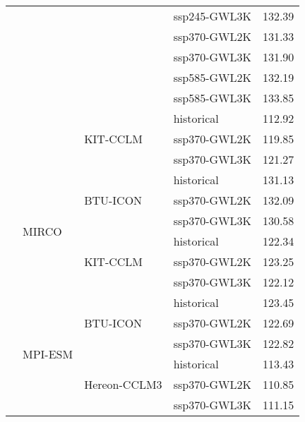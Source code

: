 \begin{table}[!htbp]
\begin{tabular}{lll|l|r}
 &  &  & ssp245-GWL3K & 132.39 \\
 &  &  & ssp370-GWL2K & 131.33 \\
 &  &  & ssp370-GWL3K & 131.90 \\
 &  &  & ssp585-GWL2K & 132.19 \\
 &  &  & ssp585-GWL3K & 133.85 \\
\cmidrule(lr){3-5}
 &  & \multirow{3}{*}{KIT-CCLM} & historical & 112.92 \\
 &  &  & ssp370-GWL2K & 119.85 \\
 &  &  & ssp370-GWL3K & 121.27 \\
\cmidrule(lr){3-5}
\cmidrule(lr){2-5}
 & \multirow{6}{*}{MIRCO} & \multirow{3}{*}{BTU-ICON} & historical & 131.13 \\
 &  &  & ssp370-GWL2K & 132.09 \\
 &  &  & ssp370-GWL3K & 130.58 \\
\cmidrule(lr){3-5}
 &  & \multirow{3}{*}{KIT-CCLM} & historical & 122.34 \\
 &  &  & ssp370-GWL2K & 123.25 \\
 &  &  & ssp370-GWL3K & 122.12 \\
\cmidrule(lr){3-5}
\cmidrule(lr){2-5}
 & \multirow{6}{*}{MPI-ESM} & \multirow{3}{*}{BTU-ICON} & historical & 123.45 \\
 &  &  & ssp370-GWL2K & 122.69 \\
 &  &  & ssp370-GWL3K & 122.82 \\
\cmidrule(lr){3-5}
 &  & \multirow{3}{*}{Hereon-CCLM3} & historical & 113.43 \\
 &  &  & ssp370-GWL2K & 110.85 \\
 &  &  & ssp370-GWL3K & 111.15 \\
\bottomrule
\end{tabular}
\end{table}
